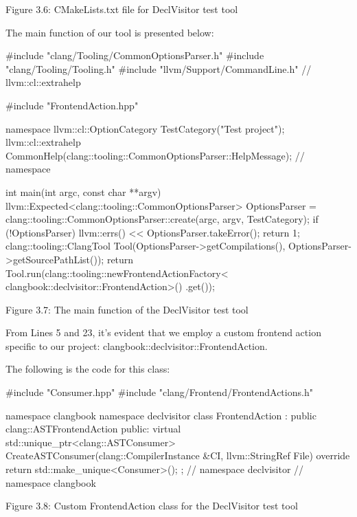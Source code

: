 \begin{center}
Figure 3.6: CMakeLists.txt file for DeclVisitor test tool
\end{center}

The main function of our tool is presented below:

\begin{cpp}
#include "clang/Tooling/CommonOptionsParser.h"
#include "clang/Tooling/Tooling.h"
#include "llvm/Support/CommandLine.h" // llvm::cl::extrahelp

#include "FrontendAction.hpp"

namespace {
  llvm::cl::OptionCategory TestCategory("Test project");
  llvm::cl::extrahelp
    CommonHelp(clang::tooling::CommonOptionsParser::HelpMessage);
} // namespace

int main(int argc, const char **argv) {
  llvm::Expected<clang::tooling::CommonOptionsParser> OptionsParser =
    clang::tooling::CommonOptionsParser::create(argc, argv, TestCategory);
  if (!OptionsParser) {
    llvm::errs() << OptionsParser.takeError();
    return 1;
  }
  clang::tooling::ClangTool Tool(OptionsParser->getCompilations(),
                                 OptionsParser->getSourcePathList());
  return Tool.run(clang::tooling::newFrontendActionFactory<
                       clangbook::declvisitor::FrontendAction>()
                       .get());
}
\end{cpp}

\begin{center}
Figure 3.7: The main function of the DeclVisitor test tool
\end{center}

From Lines 5 and 23, it’s evident that we employ a custom frontend action specific to our project: clangbook::declvisitor::FrontendAction.

The following is the code for this class:

\begin{cpp}
#include "Consumer.hpp"
#include "clang/Frontend/FrontendActions.h"

namespace clangbook {
namespace declvisitor {
class FrontendAction : public clang::ASTFrontendAction {
public:
  virtual std::unique_ptr<clang::ASTConsumer>
  CreateASTConsumer(clang::CompilerInstance &CI,
                    llvm::StringRef File) override {
    return std::make_unique<Consumer>();
  }
};
} // namespace declvisitor
}// namespace clangbook
\end{cpp}

\begin{center}
Figure 3.8: Custom FrontendAction class for the DeclVisitor test tool
\end{center}

